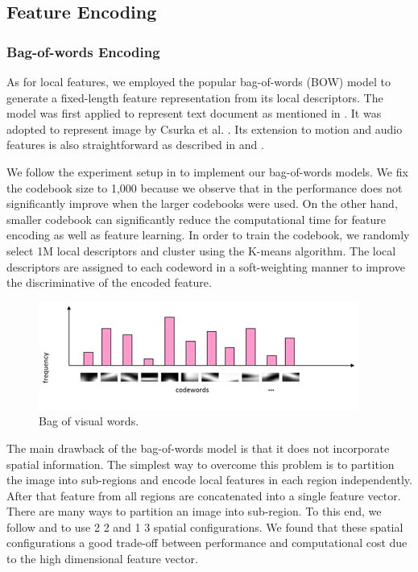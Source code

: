 \documentclass[twocolumn]{bmcart}%
\begin{document}
\subsection{Feature Encoding}
\label{feature_encoding}
\subsubsection{Bag-of-words Encoding}

As for local features, we employed the popular bag-of-words (BOW) model to generate a fixed-length feature representation from its local descriptors. The model was first applied to represent text document as mentioned in \cite{harris1954distributional}. It was adopted to represent image by Csurka et al. \cite{csurka2004visual}. Its extension to motion and audio features is also straightforward as described in \cite{sivic2009efficient} and \cite{jiang2010columbia}. 

We follow the experiment setup in \cite{jiang2010representations} to implement our bag-of-words models. We fix the codebook size to 1,000 because we observe that in \cite{jiang2010representations} the performance does not significantly improve when the larger codebooks were used. On the other hand, smaller codebook can significantly reduce the computational time for feature encoding as well as feature learning. In order to train the codebook, we randomly select 1M local descriptors and cluster using the K-means algorithm. The local descriptors are assigned to each codeword in a soft-weighting manner \cite{jiang2007towards} to improve the discriminative of the encoded feature.
\begin{figure}[!h]
	\centering
	\includegraphics[width=1\linewidth]{Images/Bow.png}
	\caption{Bag of visual words.}
	\label{fig:bow}
\end{figure}

The main drawback of the bag-of-words model is that it does not incorporate spatial information. The simplest way to overcome this problem is to partition the image into sub-regions and encode local features in each region independently. After that feature from all regions are concatenated into a single feature vector. There are many ways to partition an image into sub-region. To this end, we follow \cite{jiang2010representations} and \cite{lazebnik2006beyond} to use 2  2 and 1  3 spatial configurations. We found that these spatial configurations a good trade-off between performance and computational cost due to the high dimensional feature vector.
\end{document}
